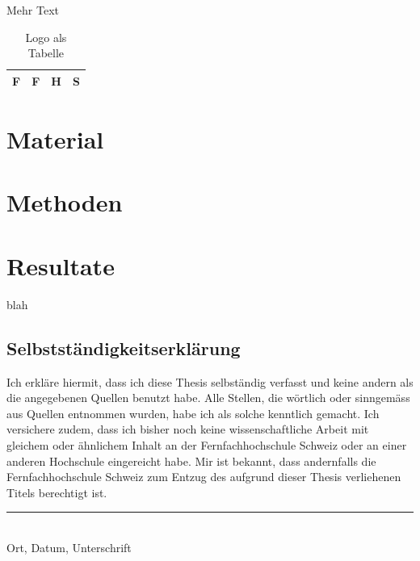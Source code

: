 \documentclass{ffhsthesis}
\begin{document}
Mehr Text
 
\begin{table}[ht]
  \begin{center}
  \begin{tabular}{|c|c|c|c|}
  \hline
  F & F & H & S \\
  \hline
  \end{tabular}
  \end{center}
  \caption{Logo als Tabelle}
\end{table}

\chapter{Material}

\chapter{Methoden}

\chapter{Resultate}



\listoffigures

\listoftables

\begin{thebibliography}{XX}
 blah
\end{thebibliography}

% 

\newpage

\begin{appendix}


\chapter*{Selbstständigkeitserklärung}
Ich erkläre hiermit, dass ich diese Thesis selbständig verfasst 
und keine andern als die angegebenen Quellen benutzt habe. 
Alle Stellen, die wörtlich oder sinngemäss aus Quellen entnommen wurden, 
habe ich als solche kenntlich gemacht. Ich versichere zudem, dass ich bisher 
noch keine wissenschaftliche Arbeit mit gleichem oder ähnlichem Inhalt an der 
Fernfachhochschule Schweiz oder an einer anderen Hochschule eingereicht habe. 
Mir ist bekannt, dass andernfalls die Fernfachhochschule Schweiz zum Entzug 
des aufgrund dieser Thesis verliehenen Titels berechtigt ist.

\vspace{4cm}
\noindent
\hrule \ \\[-0.5ex]
Ort, Datum, Unterschrift
\end{appendix}
\end{document}
